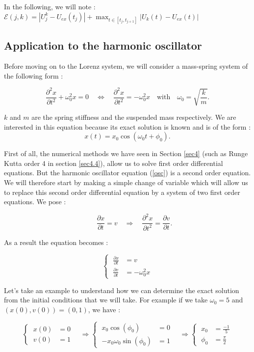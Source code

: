 \noindent In the following, we will note : \quad $\mathcal{E}(j,k)=|U_j^k-U_{ex}(t_j)|+\max_{t\in[t_j,t_{j+1}]}|U_k(t)-U_{ex}(t)|$

\subsection{Application to the harmonic oscillator}

\noindent Before moving on to the Lorenz system, we will consider a mass-spring system of the following form :

\begin{equation}
	\frac{\partial^2 x}{\partial t^2}+\omega_0^2 x = 0 \quad \iff \quad \frac{\partial^2 x}{\partial t^2}=-\omega_0^2 x \quad \text{with} \quad \omega_0=\sqrt{\frac{k}{m}}.
	\label{osc}
\end{equation}

\noindent $k$ and $m$ are the spring stiffness and the suspended mass respectively. We are interested in this equation because its exact solution is known and is of the form :
$$x(t) = x_0 \cos(\omega_{0}t+\phi_0).$$

\noindent First of all, the numerical methods we have seen in Section \ref{sec4} (such as Runge Kutta order 4 in section \ref{sec4.4}), allow us to solve first order differential equations. But the harmonic oscillator equation (\ref{osc}) is a second order equation. We will therefore start by making a simple change of variable which will allow us to replace this second order differential equation by a system of two first order equations. We pose :
 
$$\qquad \frac{\partial x}{\partial t}=v \quad \Rightarrow \quad \frac{\partial^2 x}{\partial t^2}=\frac{\partial v}{\partial t}.$$

\noindent As a result the equation becomes :

$$\left\{\;\begin{aligned}
	\frac{\partial x}{\partial t}&=v \\
	\frac{\partial v}{\partial t}&=-\omega_0^2 x
\end{aligned}\right.
$$

\noindent Let's take an example to understand how we can determine the exact solution from the initial conditions that we will take. For example if we take $\omega_0=5$ and $(x(0),v(0))=(0,1)$, we have :

$$\left\{\;\begin{aligned}
	x(0)&=0 \\
	v(0)&=1
\end{aligned}\right. \quad \Rightarrow 
\left\{\;\begin{aligned}
	x_0 \cos(\phi_0)&=0 \\
	-x_0 \omega_{0} \sin(\phi_0)&=1
\end{aligned}\right.  \quad \Rightarrow  
\left\{\;\begin{aligned}
	x_0&=\frac{-1}{5} \\
	\phi_0&=\frac{\pi}{2}
\end{aligned}\right.
$$

